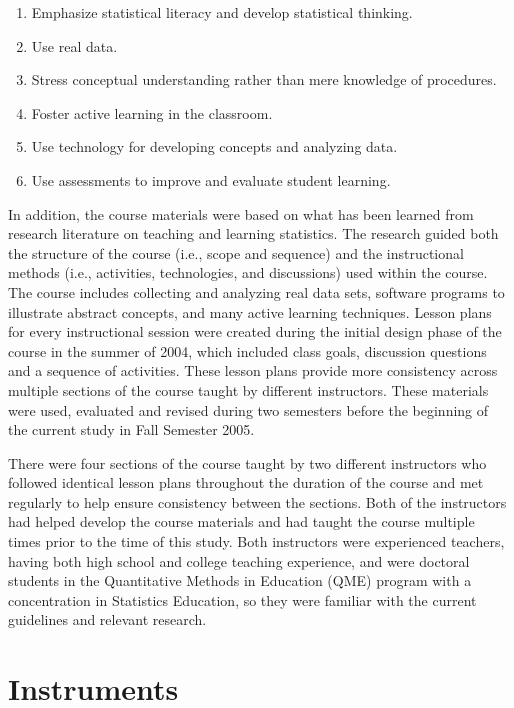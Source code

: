 \documentclass[11pt]{umnthesis}
\begin{document}
\begin{enumerate}
\def\labelenumi{\arabic{enumi}.}
\tightlist
\item
  Emphasize statistical literacy and develop statistical thinking.
\item
  Use real data.
\item
  Stress conceptual understanding rather than mere knowledge of procedures.
\item
  Foster active learning in the classroom.
\item
  Use technology for developing concepts and analyzing data.
\item
  Use assessments to improve and evaluate student learning.
\end{enumerate}

In addition, the course materials were based on what has been learned from research literature on teaching and learning statistics. The research guided both the structure of the course (i.e., scope and sequence) and the instructional methods (i.e., activities, technologies, and discussions) used within the course. The course includes collecting and analyzing real data sets, software programs to illustrate abstract concepts, and many active learning techniques. Lesson plans for every instructional session were created during the initial design phase of the course in the summer of 2004, which included class goals, discussion questions and a sequence of activities. These lesson plans provide more consistency across multiple sections of the course taught by different instructors. These materials were used, evaluated and revised during two semesters before the beginning of the current study in Fall Semester 2005.

There were four sections of the course taught by two different instructors who followed identical lesson plans throughout the duration of the course and met regularly to help ensure consistency between the sections. Both of the instructors had helped develop the course materials and had taught the course multiple times prior to the time of this study. Both instructors were experienced teachers, having both high school and college teaching experience, and were doctoral students in the Quantitative Methods in Education (QME) program with a concentration in Statistics Education, so they were familiar with the current guidelines and relevant research.

\hypertarget{instruments}{%
\section{Instruments}\label{instruments}}
\end{document}
